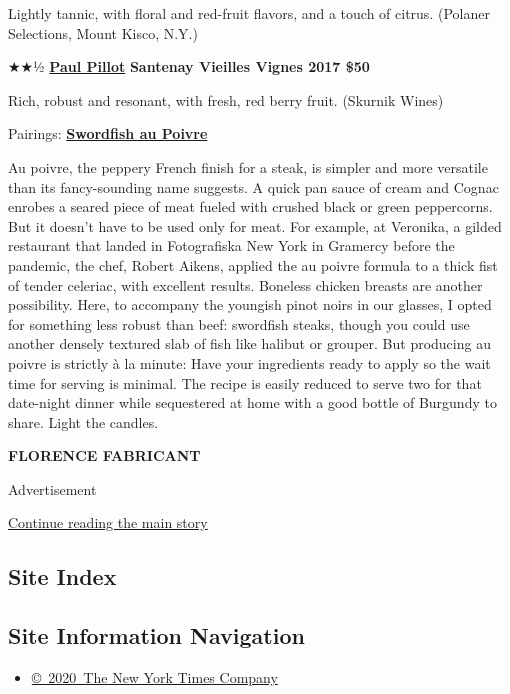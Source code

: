 Lightly tannic, with floral and red-fruit flavors, and a touch of
citrus. (Polaner Selections, Mount Kisco, N.Y.)

★★½
\href{https://www.skurnik.com/producer/domaine-paul-pillot/}{\textbf{Paul
Pillot}} \textbf{Santenay Vieilles Vignes 2017 \$50}

Rich, robust and resonant, with fresh, red berry fruit. (Skurnik Wines)

Pairings:
\href{https://cooking.nytimes3xbfgragh.onion/recipes/1021120-swordfish-au-poivre}{\textbf{Swordfish
au Poivre}}

Au poivre, the peppery French finish for a steak, is simpler and more
versatile than its fancy-sounding name suggests. A quick pan sauce of
cream and Cognac enrobes a seared piece of meat fueled with crushed
black or green peppercorns. But it doesn't have to be used only for
meat. For example, at Veronika, a gilded restaurant that landed in
Fotografiska New York in Gramercy before the pandemic, the chef, Robert
Aikens, applied the au poivre formula to a thick fist of tender
celeriac, with excellent results. Boneless chicken breasts are another
possibility. Here, to accompany the youngish pinot noirs in our glasses,
I opted for something less robust than beef: swordfish steaks, though
you could use another densely textured slab of fish like halibut or
grouper. But producing au poivre is strictly à la minute: Have your
ingredients ready to apply so the wait time for serving is minimal. The
recipe is easily reduced to serve two for that date-night dinner while
sequestered at home with a good bottle of Burgundy to share. Light the
candles.

\textbf{FLORENCE FABRICANT}

Advertisement

\protect\hyperlink{after-bottom}{Continue reading the main story}

\hypertarget{site-index}{%
\subsection{Site Index}\label{site-index}}

\hypertarget{site-information-navigation}{%
\subsection{Site Information
Navigation}\label{site-information-navigation}}

\begin{itemize}
\tightlist
\item
  \href{https://help.nytimes3xbfgragh.onion/hc/en-us/articles/115014792127-Copyright-notice}{©~2020~The
  New York Times Company}
\end{itemize}

